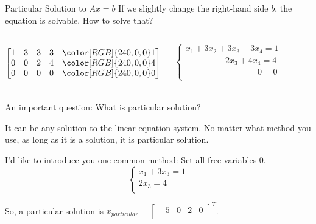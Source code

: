 \documentclass{beamer}
\begin{document}
\begin{frame}{Particular Solution to $Ax=b$}
If we slightly change the right-hand side $b$, the equation is solvable. How to solve that?
\begin{columns}
\begin{equation*}
    \left[ \begin{matrix}
        1&		3&		3&		3&		{\color[RGB]{240, 0, 0} 1}\\
        0&		0&		2&		4&		{\color[RGB]{240, 0, 0} 4}\\
        0&		0&		0&		0&		{\color[RGB]{240, 0, 0} 0}\\
    \end{matrix} \right]
\end{equation*}

\vspace{-8pt}
\begin{equation*}
    \begin{cases}
        x_1+3x_2+3x_3+3x_4=1\\
        \qquad\qquad\ \:\:2x_3+4x_4=4\\
        \qquad\qquad\qquad\qquad\:\:0=0\\
    \end{cases}
\end{equation*}
\end{columns}



An important question: What is particular solution?

\vspace{3pt}
It can be any solution to the linear equation system. No matter what method you use, as long as it is a solution, it is particular solution.

\vspace{3pt}
I'd like to introduce you one common method: Set all free variables 0.
\begin{equation*}
    \begin{cases}
        x_1+3x_3=1\\
        2x_3=4\\
    \end{cases}
\end{equation*}

So, a particular solution is $x_{particular}=\left[ \begin{matrix}
	-5&		0&		2&		0\\
\end{matrix} \right] ^T$.
\end{frame}
\end{document}
